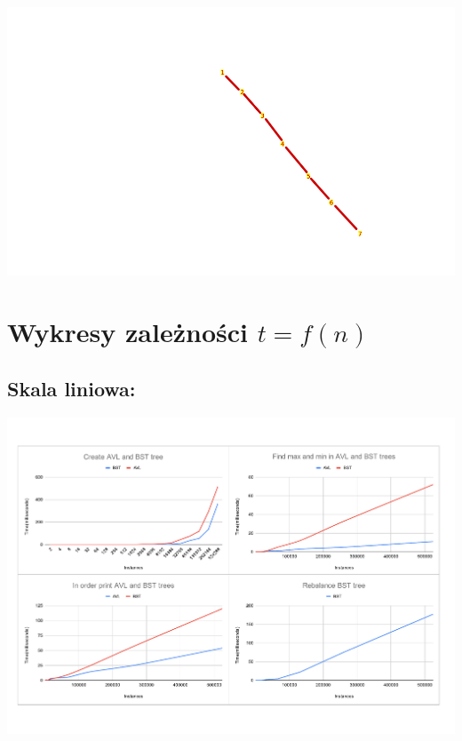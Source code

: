 \documentclass[12pt]{article}
\begin{document}
\begin{center}

\includegraphics[scale=0.5]{bst_vi.png}	 

\end{center}

\section{Wykresy zależności $ t = f(n) $}

\subsection{Skala liniowa: }

\begin{center}

\includegraphics[width=\linewidth]{wykresy_obok_1.pdf}

\end{center}
\end{document}
